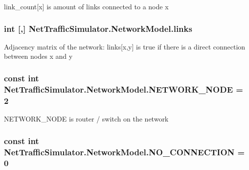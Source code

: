 link\-\_\-count\mbox{[}x\mbox{]} is amount of links connected to a node x \hypertarget{classNetTrafficSimulator_1_1NetworkModel_a3b9f06cc5ec93f59a6bf7e4042b70e48}{
\subsubsection[{links}]{\setlength{\rightskip}{0pt plus 5cm}int \mbox{[},\mbox{]} Net\-Traffic\-Simulator.\-Network\-Model.\-links\hspace{0.3cm}{\ttfamily [private]}}}\label{classNetTrafficSimulator_1_1NetworkModel_a3b9f06cc5ec93f59a6bf7e4042b70e48}
Adjacency matrix of the network\-: links\mbox{[}x,y\mbox{]} is true if there is a direct connection between nodes x and y \hypertarget{classNetTrafficSimulator_1_1NetworkModel_ab2882fa4fe981780f78f822b12677f88}{
\subsubsection[{N\-E\-T\-W\-O\-R\-K\-\_\-\-N\-O\-D\-E}]{\setlength{\rightskip}{0pt plus 5cm}const int Net\-Traffic\-Simulator.\-Network\-Model.\-N\-E\-T\-W\-O\-R\-K\-\_\-\-N\-O\-D\-E = 2}}\label{classNetTrafficSimulator_1_1NetworkModel_ab2882fa4fe981780f78f822b12677f88}
N\-E\-T\-W\-O\-R\-K\-\_\-\-N\-O\-D\-E is router / switch on the network \hypertarget{classNetTrafficSimulator_1_1NetworkModel_a9e0ef364abc36d5bd8ebda5d703dc76b}{
\subsubsection[{N\-O\-\_\-\-C\-O\-N\-N\-E\-C\-T\-I\-O\-N}]{\setlength{\rightskip}{0pt plus 5cm}const int Net\-Traffic\-Simulator.\-Network\-Model.\-N\-O\-\_\-\-C\-O\-N\-N\-E\-C\-T\-I\-O\-N = 0\hspace{0.3cm}{\ttfamily [private]}}}\label{classNetTrafficSimulator_1_1NetworkModel_a9e0ef364abc36d5bd8ebda5d703dc76b}
